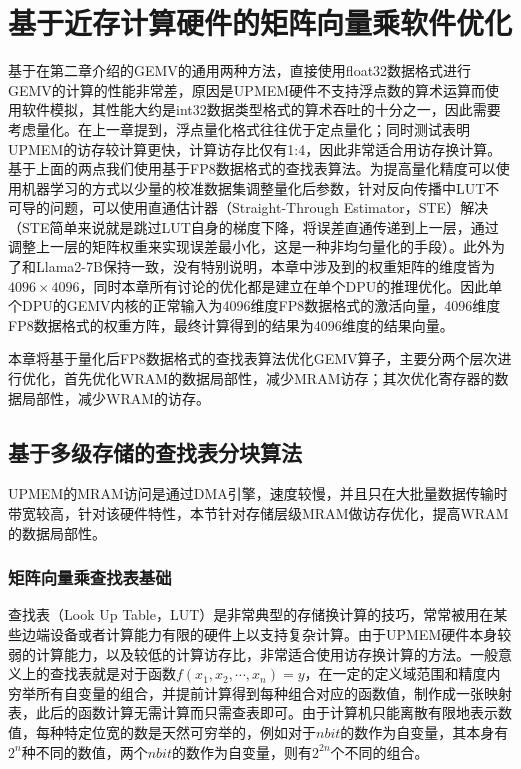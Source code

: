\chapter{基于近存计算硬件的矩阵向量乘软件优化}
基于在第二章介绍的GEMV的通用两种方法，直接使用float32数据格式进行GEMV的计算的性能非常差，原因是UPMEM硬件不支持浮点数的算术运算而使用软件模拟，其性能大约是int32数据类型格式的算术吞吐的十分之一\cite{BenchmarkingMutlu}，因此需要考虑量化。在上一章提到，浮点量化格式往往优于定点量化\cite{ZeroQuantFP}；同时测试表明UPMEM的访存较计算更快，计算访存比仅有1:4\cite{BenchmarkingMutlu}，因此非常适合用访存换计算。基于上面的两点我们使用基于FP8数据格式\cite{FP8}的查找表算法。为提高量化精度可以使用机器学习的方式以少量的校准数据集调整量化后参数，针对反向传播中LUT不可导的问题，可以使用直通估计器（Straight-Through Estimator，STE）解决\cite{NonuniformQuant}（STE简单来说就是跳过LUT自身的梯度下降，将误差直通传递到上一层，通过调整上一层的矩阵权重来实现误差最小化，这是一种非均匀量化的手段）。此外为了和Llama2-7B保持一致，没有特别说明，本章中涉及到的权重矩阵的维度皆为$4096\times 4096$，同时本章所有讨论的优化都是建立在单个DPU的推理优化。因此单个DPU的GEMV内核的正常输入为4096维度FP8数据格式的激活向量，4096维度FP8数据格式的权重方阵，最终计算得到的结果为4096维度的结果向量。

本章将基于量化后FP8数据格式的查找表算法优化GEMV算子，主要分两个层次进行优化，首先优化WRAM的数据局部性，减少MRAM访存；其次优化寄存器的数据局部性，减少WRAM的访存。

\section{基于多级存储的查找表分块算法}
UPMEM的MRAM访问是通过DMA引擎，速度较慢，并且只在大批量数据传输时带宽较高，针对该硬件特性，本节针对存储层级MRAM做访存优化，提高WRAM的数据局部性。

\subsection{矩阵向量乘查找表基础}
查找表（Look Up Table，LUT）是非常典型的存储换计算的技巧，常常被用在某些边端设备或者计算能力有限的硬件上以支持复杂计算。由于UPMEM硬件本身较弱的计算能力，以及较低的计算访存比，非常适合使用访存换计算的方法。一般意义上的查找表就是对于函数$f(x_1,x_2,\cdots,x_n)=y$，在一定的定义域范围和精度内穷举所有自变量的组合，并提前计算得到每种组合对应的函数值，制作成一张映射表，此后的函数计算无需计算而只需查表即可。由于计算机只能离散有限地表示数值，每种特定位宽的数是天然可穷举的，例如对于$n bit$的数作为自变量，其本身有$2^n$种不同的数值，两个$n bit$的数作为自变量，则有$2^{2n}$个不同的组合。

